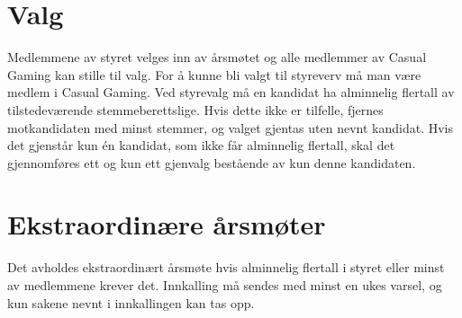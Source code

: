 \section{Valg}
Medlemmene av styret velges inn av årsmøtet og alle medlemmer av Casual Gaming kan stille til valg. For å kunne bli valgt til styreverv må man være medlem i Casual Gaming. Ved styrevalg må en kandidat ha alminnelig flertall av tilstedeværende stemmeberettslige. Hvis dette ikke er tilfelle, fjernes motkandidaten med minst stemmer, og valget gjentas uten nevnt kandidat. Hvis det gjenstår kun én kandidat, som ikke får alminnelig flertall, skal det gjennomføres ett og kun ett gjenvalg bestående av kun denne kandidaten.

\section{Ekstraordinære årsmøter}
Det avholdes ekstraordinært årsmøte hvis alminnelig flertall i styret eller minst  av medlemmene krever det. Innkalling må sendes med minst en ukes varsel, og kun sakene nevnt i innkallingen kan tas opp.
